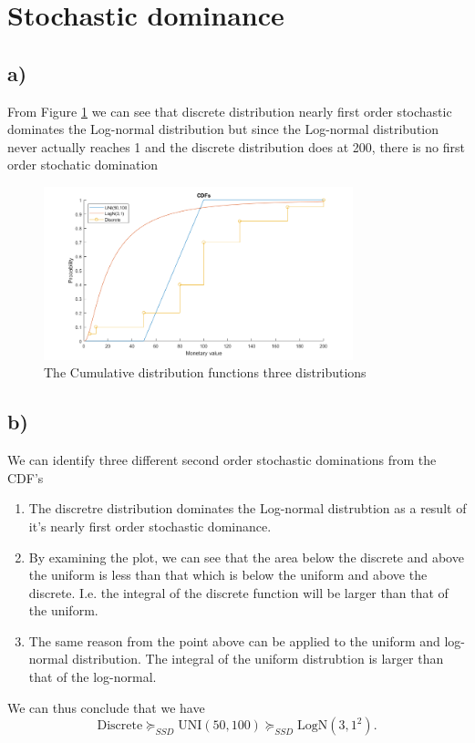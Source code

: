 \documentclass{article}
\begin{document}
\section{Stochastic dominance}
\subsection{a)}
	From Figure \ref{fig:5} we can see that discrete distribution nearly first order stochastic dominates the Log-normal distribution but since the Log-normal distribution never actually reaches 1 and the discrete distribution does at 200, there is no first order stochatic domination
	
	\begin{figure}[H]
		\includegraphics[width=0.8\textwidth]{5.png}
		\caption{The Cumulative distribution functions three distributions}
		\label{fig:5}
	\end{figure}
\subsection{b)}
	We can identify three different second order stochastic dominations from the CDF's
	\begin{enumerate}
		\item The discretre distribution dominates the Log-normal distrubtion as a result of it's nearly first order stochastic dominance.
		\item By examining the plot, we can see that the area below the discrete and above the uniform is less than that which is below the uniform and above the discrete. I.e. the integral of the discrete function will be larger than that of the uniform.
		\item  The same reason from the point above can be applied to the uniform and log-normal distribution. The integral of the uniform distrubtion is larger than that of the log-normal.
	\end{enumerate}
		We can thus conclude that we have
		\begin{equation}
			\text{Discrete} \succcurlyeq_{SSD} \text{UNI}(50,100) \succcurlyeq_{SSD} \text{LogN}(3,1^2).
		\end{equation}
\end{document}
